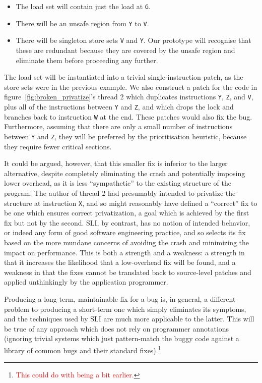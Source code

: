 \documentclass[10pt,twocolumn,preprint,natbib,authoryear]{sigplanconf}
\newcommand{\editorial}[1]{\textcolor{red}{\footnote{\textcolor{red}{#1}}}}
\begin{document}
\begin{itemize}
\item The load set will contain just the load at \verb|G|.
\item There will be an unsafe region from \verb|Y| to \verb|V|. 
\item There will be singleton store sets \verb|V| and \verb|Y|.  Our
  prototype will recognise that these are redundant because they are
  covered by the unsafe region and eliminate them before proceeding
  any further.
\end{itemize}

The load set will be instantiated into a trivial single-instruction
patch, as the store sets were in the previous example.  We also
construct a patch for the code in figure~\ref{fig:broken_privatize}'s
thread 2 which duplicates instructions \verb|Y|, \verb|Z|, and
\verb|V|, plus all of the instructions between \verb|Y| and \verb|Z|,
and which drops the lock and branches back to instruction \verb|W| at
the end.  These patches would also fix the bug.  Furthermore, assuming
that there are only a small number of instructions between \verb|Y|
and \verb|Z|, they will be preferred by the prioritisation heuristic,
because they require fewer critical sections.

It could be argued, however, that this smaller fix is inferior to the
larger alternative, despite completely eliminating the crash and
potentially imposing lower overhead, as it is less ``sympathetic'' to
the existing structure of the program.  The author of thread 2 had
presumably intended to privatize the structure at instruction
\verb|X|, and so might reasonably have defined a ``correct'' fix to be
one which ensures correct privatization, a goal which is achieved by
the first fix but not by the second.  SLI, by contrast, has no notion
of intended behavior, or indeed any form of good software engineering
practice, and so selects its fix based on the more mundane concerns of
avoiding the crash and minimizing the impact on performance.  This is
both a strength and a weakness: a strength in that it increases the
likelihood that a low-overhead fix will be found, and a weakness in
that the fixes cannot be translated back to source-level patches and
applied unthinkingly by the application programmer.

Producing a long-term, maintainable fix for a bug is, in general, a
different problem to producing a short-term one which simply
eliminates its symptoms, and the techniques used by SLI are much more
applicable to the latter.  This will be true of any approach which
does not rely on programmer annotations (ignoring trivial systems
which just pattern-match the buggy code against a library of common
bugs and their standard fixes).\editorial{This could do with being a
  bit earlier.}
\end{document}
